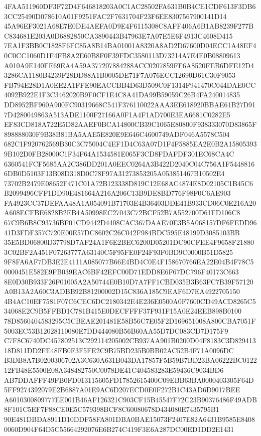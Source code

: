 \documentclass[UTF8,fontset=fandol,zihao=-4,a4paper]{ctexart}
\begin{document}
{{4FAA511960DF3F72D4F646818203A0C1AC28502FA631B0B4CE1CDF613F3DB63CC25490D078610A01F9251FAC2F7631704F23F6EE8307567900141D14
45A96EF3021A68E7E0DE4AEFA0D9E4F6115308C8AFF406A6B1AB8239F277BC834681E203A0D6882850CA3890443B47963E7A07E5E6F4913C4608D415
7EA1F3BB0C1828F6FC85A8B14BA01001A8320A8AD2D67600D04ECC1A48EF40C0CC1060D1F4FB8A2E60B8F0F39FDC3580113D73214A7E4E0B08809613
A010A9E140FE69EA4A59A377207884288ACC0207859FF6A8520FEB6DFE12D43286CA1180B4239F28DD88A1B0005DE71F7A076ECC12690D61C30F9053
FB794E28D1A0EE2A1FFE90EACCBB4D63D509C0F1314F941470C044DAE0CC4092B922E1F3C3462020B9F0CF1E4C8A41DA99B59059C26B4FA240014835
DD8952BF960A900FC90319668C541F376110022AAA3EE618920BBAE61B27D917D4280049863A513ADE1100F27166A0F1A4F1AD700E3EA6681C0282E5
EF83CD818A722E5D82AAEF0BCA14800CB39C1065E80800F938333070D83865F898888030F9B38B81BA5AAE5E820E9E646C4600749ADF046A5578C504
682C1F920762569B30C3C75004C4EF1D4C63A07D1F4F5885EA2E0B2A158053939B102D0FB28000C1F34F64A1534581E065F3CD8FDAFDF301EC68CA4C
6360541FCF5685AA2C386DD201A0EEC0264A3B422D2040C04C756A1F54488166DB0D5103F13B08D318D0C78F97A31273853205A053851467B10502E4
73702B2479E08652F471C01A72B123338D819C12E68AC4874E8D02105C1B45C6B2099496CFF1DD90E481664A216A206C13B9DE8BD776F98F0C6AE903
FA4923CC37DEFAA48A1A054091B71703E4B36403DDE41B933CD06C0E216A20A608ECFBE6828B2EB4A50998EC27043C72BCF52B7A552700D61FD106C8
67C9B6B8C93736BF01CD9442D4408CAC367DAAE70E3B5A068157DF6FEDD9641D3FDF357C720E00E57DC8602C26C042F984BDC595E48199D3085103BB
35E5BD06800D37798D7AF24A1F6E2BEC6200D05201DC90CFEE4F9658F218803C02BF2A451F07263777A63140C5F95FE0F24F93F0BD9C0000B51D5825
9F8FA6AF7DB3E2E4111A085077B66E4BD4C0E4F158670766EA22E04B4F78C50000451E582E9FB039EAC6BF42EFC00D71EDD8E6F67DC796F40173C663
8E0D30B933F26F01005A2A50744E0B10D7A7FF1CBD035B3B63FC7B39F57120A0B13A2A60C3ADBB92B81200002D15C836A185C9EAF6D7EA4922705150
4B4AC10EF7581F07C6CEC6DC2180342E4E236E0500A0F7600CD49ACD8265C534068E2C9B5FFBD1C781B415E0DECFFFF37F931F15A0E24EEB898B0100
78D8560404583295C5CBEAE201481E58B56C7E05F2D169651008A800CBA7051F5003EC53B12028110080E7DD444080B56B60AA55D7DC083CD7D175F9
C7F8C6740DC457802513C292114205002CB937AA901B0200D04F8183C3D82941318D811DD2FE48FB0F3F5FE2C9B75BD235B0BB02AC52B4F71A0096DC
B3DB8A7B0200306702A3C630A631B043DA17857F5B59B7BD23BA06222BC012212FB48E5500E08A348482750C0078DE41C404583283E59436C9034BD6
AB7DDAFFF49FB0FD013115605FD17852615400C09EBB63BA0000403305F64D5FF9274392079E2B6887A01E9AC6D207ECD0E0F272B1C43AD6D9017BEE
A6010300809777EE001B46AF126321C903CF15B45547F72C23B90376486F49ADB8F101C5EF7F88CE0E5C579398BCF8C60080678D434080E7435795B1
90E481DBDA8911D10DDF58FA801DBA0BAE15073F2407E82A6431B9585E84080060D904F64D5C55664292076E6B274C419F3E6A287DC00ED1DD2E1431
}}
\end{document}
